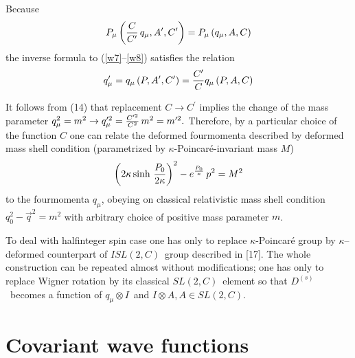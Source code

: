 \documentclass[a4paper,a4paper]{article}
\begin{document}
Because
\begin{equation}\label{luma13} %
  P_{\mu}\left( {C\over C^{\prime}} \, q_{\mu},
  A^{\prime}, C^{\prime} \right)
  = P_{\mu} \left( q_{\mu}, A,C\right)
\end{equation}
the inverse formula to
 (\ref{w7}--\ref{w8})
 satisfies the relation
\begin{equation}\label{luma14} %
  q^{\prime}_{\mu} = q_{\mu} \left( P,A^{\prime},C^{\prime}\right)
  =  {C^{\prime}\over C} q_{\mu}
  \left( P, A, C \right)
\end{equation}

It follows from (14)
  that replacement $C \to C^{\prime}$ implies the
change of the mass parameter $q^{2}_{\mu} = m^{2} \to q^{\prime
2}_{\mu} =  {C^{\prime 2}\over C^{2}} \, m^{2} = m^{\prime 2}.$
Therefore, by a particular choice of the function $C$ one can relate the
deformed fourmomenta described by deformed mass shell condition
 (parametrized by  $\kappa$-Poincar\'{e}-invariant mass $M$)
\begin{eqnarray}\label{luma14b}  %
  \left( 2 \kappa \sinh \, {P_{0}\over 2 \kappa} \right)^{2}
  - e^{P_{0}\over \kappa} \, p^{2} = M^{2}
\end{eqnarray}
to the  fourmomenta $q_{\mu}$, obeying on classical relativistic
mass shell condition $q_{0}^{2} - \overrightarrow{q}^{2}
 = m^{2}$ with
arbitrary choice of positive mass parameter $m$.

To deal with halfinteger spin case one has only to replace
$\kappa$-Poincar\'{e} group by $\kappa$--deformed  counterpart of
$ISL(2,C)$\ group described in [17]. The whole construction can be
repeated  almost without modifications; one has only to replace
Wigner rotation by its  classical $SL(2,C)$\ element so that
$D^{(s)} $\ becomes a function of $q_{\mu}\otimes I$\ and
$I\otimes A, A\in
SL(2,C).$%
\

\section{Covariant wave functions}
\end{document}
